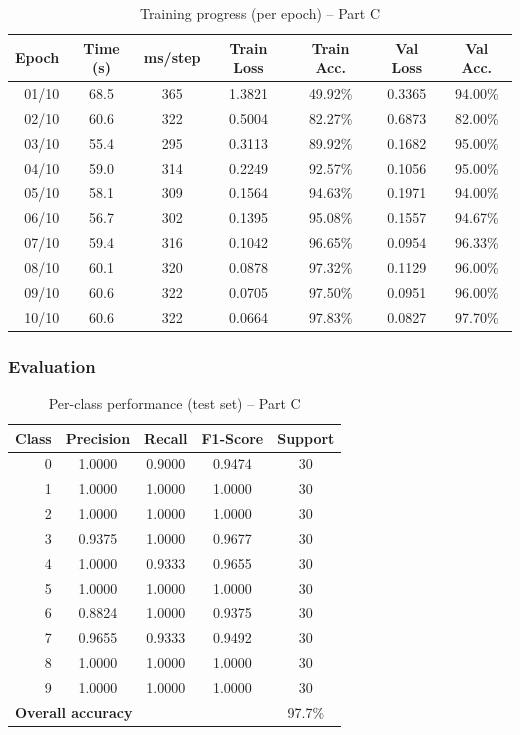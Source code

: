 \begin{table}[H]
\centering
\caption{Training progress (per epoch) -- Part C}
\label{tab:p3c_epochs}
\begin{tabular}{rcccccc}
\toprule
Epoch & Time (s) & ms/step & Train Loss & Train Acc. & Val Loss & Val Acc. \\
\midrule
01/10 & 68.5 & 365 & 1.3821 & 49.92\% & 0.3365 & 94.00\% \\
02/10 & 60.6 & 322 & 0.5004 & 82.27\% & 0.6873 & 82.00\% \\
03/10 & 55.4 & 295 & 0.3113 & 89.92\% & 0.1682 & 95.00\% \\
04/10 & 59.0 & 314 & 0.2249 & 92.57\% & 0.1056 & 95.00\% \\
05/10 & 58.1 & 309 & 0.1564 & 94.63\% & 0.1971 & 94.00\% \\
06/10 & 56.7 & 302 & 0.1395 & 95.08\% & 0.1557 & 94.67\% \\
07/10 & 59.4 & 316 & 0.1042 & 96.65\% & 0.0954 & 96.33\% \\
08/10 & 60.1 & 320 & 0.0878 & 97.32\% & 0.1129 & 96.00\% \\
09/10 & 60.6 & 322 & 0.0705 & 97.50\% & 0.0951 & 96.00\% \\
10/10 & 60.6 & 322 & 0.0664 & 97.83\% & 0.0827 & 97.70\% \\
\bottomrule
\end{tabular}
\end{table}

\subsubsection*{Evaluation}
\begin{table}[H]
\centering
\caption{Per-class performance (test set) -- Part C}
\label{tab:p3c_perclass}
\begin{tabular}{rcccc}
\toprule
Class & Precision & Recall & F1-Score & Support \\
\midrule
0 & 1.0000 & 0.9000 & 0.9474 & 30 \\
1 & 1.0000 & 1.0000 & 1.0000 & 30 \\
2 & 1.0000 & 1.0000 & 1.0000 & 30 \\
3 & 0.9375 & 1.0000 & 0.9677 & 30 \\
4 & 1.0000 & 0.9333 & 0.9655 & 30 \\
5 & 1.0000 & 1.0000 & 1.0000 & 30 \\
6 & 0.8824 & 1.0000 & 0.9375 & 30 \\
7 & 0.9655 & 0.9333 & 0.9492 & 30 \\
8 & 1.0000 & 1.0000 & 1.0000 & 30 \\
9 & 1.0000 & 1.0000 & 1.0000 & 30 \\
\midrule
\multicolumn{4}{l}{\textbf{Overall accuracy}} & 97.7\% \\
\bottomrule
\end{tabular}
\end{table}

